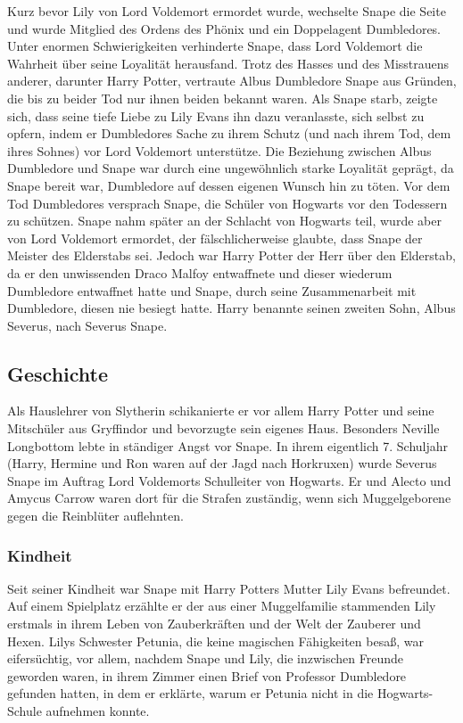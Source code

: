\documentclass[a4paper, 10pt]{article}
\begin{document}
\newline
{}  
Kurz bevor Lily von Lord Voldemort ermordet wurde, wechselte Snape die Seite und wurde Mitglied des Ordens des Phönix und ein Doppelagent Dumbledores. Unter enormen Schwierigkeiten verhinderte Snape, dass Lord Voldemort die Wahrheit über seine Loyalität herausfand. Trotz des Hasses und des Misstrauens anderer, darunter Harry Potter, vertraute Albus Dumbledore Snape aus Gründen, die bis zu beider Tod nur ihnen beiden bekannt waren. Als Snape starb, zeigte sich, dass seine tiefe Liebe zu Lily Evans ihn dazu veranlasste, sich selbst zu opfern, indem er Dumbledores Sache zu ihrem Schutz (und nach ihrem Tod, dem ihres Sohnes) vor Lord Voldemort unterstütze.
\vspace{10pt}
\newline
{}  
Die Beziehung zwischen Albus Dumbledore und Snape war durch eine ungewöhnlich starke Loyalität geprägt, da Snape bereit war, Dumbledore auf dessen eigenen Wunsch hin zu töten. Vor dem Tod Dumbledores versprach Snape, die Schüler von Hogwarts vor den Todessern zu schützen. Snape nahm später an der Schlacht von Hogwarts teil, wurde aber von Lord Voldemort ermordet, der fälschlicherweise glaubte, dass Snape der Meister des Elderstabs sei. Jedoch war Harry Potter der Herr über den Elderstab, da er den unwissenden Draco Malfoy entwaffnete und dieser wiederum Dumbledore entwaffnet hatte und Snape, durch seine Zusammenarbeit mit Dumbledore, diesen nie besiegt hatte.
\vspace{10pt}
\newline
{}  
Harry benannte seinen zweiten Sohn, Albus Severus, nach Severus Snape.

\subsection*{\Large Geschichte}
Als Hauslehrer von Slytherin schikanierte er vor allem Harry Potter und seine Mitschüler aus Gryffindor und bevorzugte sein eigenes Haus. Besonders Neville Longbottom lebte in ständiger Angst vor Snape. In ihrem eigentlich 7. Schuljahr (Harry, Hermine und Ron waren auf der Jagd nach Horkruxen) wurde Severus Snape im Auftrag Lord Voldemorts Schulleiter von Hogwarts. Er und Alecto und Amycus Carrow waren dort für die Strafen zuständig, wenn sich Muggelgeborene gegen die Reinblüter auflehnten.

\subsubsection*{\large Kindheit}
Seit seiner Kindheit war Snape mit Harry Potters Mutter Lily Evans befreundet. Auf einem Spielplatz erzählte er der aus einer Muggelfamilie stammenden Lily erstmals in ihrem Leben von Zauberkräften und der Welt der Zauberer und Hexen. Lilys Schwester Petunia, die keine magischen Fähigkeiten besaß, war eifersüchtig, vor allem, nachdem Snape und Lily, die inzwischen Freunde geworden waren, in ihrem Zimmer einen Brief von Professor Dumbledore gefunden hatten, in dem er erklärte, warum er Petunia nicht in die Hogwarts-Schule aufnehmen konnte.
\end{document}
